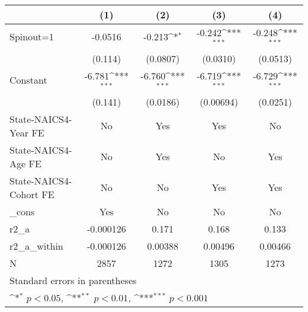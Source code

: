 {
\def\sym#1{\ifmmode^{#1}\else\(^{#1}\)\fi}
\begin{tabular}{l*{4}{c}}
\hline\hline
                    &\multicolumn{1}{c}{(1)}         &\multicolumn{1}{c}{(2)}         &\multicolumn{1}{c}{(3)}         &\multicolumn{1}{c}{(4)}         \\
\hline
Spinout=1           &     -0.0516         &      -0.213\sym{*}  &      -0.242\sym{***}&      -0.248\sym{***}\\
                    &     (0.114)         &    (0.0807)         &    (0.0310)         &    (0.0513)         \\
[1em]
Constant            &      -6.781\sym{***}&      -6.760\sym{***}&      -6.719\sym{***}&      -6.729\sym{***}\\
                    &     (0.141)         &    (0.0186)         &   (0.00694)         &    (0.0251)         \\
[1em]
State-NAICS4-Year FE&          No         &         Yes         &         Yes         &          No         \\
[1em]
State-NAICS4-Age FE &          No         &         Yes         &          No         &         Yes         \\
[1em]
State-NAICS4-Cohort FE&          No         &          No         &         Yes         &         Yes         \\
[1em]
\_cons              &         Yes         &          No         &          No         &          No         \\
\hline
r2\_a                &   -0.000126         &       0.171         &       0.168         &       0.133         \\
r2\_a\_within         &   -0.000126         &     0.00388         &     0.00496         &     0.00466         \\
N                   &        2857         &        1272         &        1305         &        1273         \\
\hline\hline
\multicolumn{5}{l}{\footnotesize Standard errors in parentheses}\\
\multicolumn{5}{l}{\footnotesize \sym{*} \(p<0.05\), \sym{**} \(p<0.01\), \sym{***} \(p<0.001\)}\\
\end{tabular}
}
